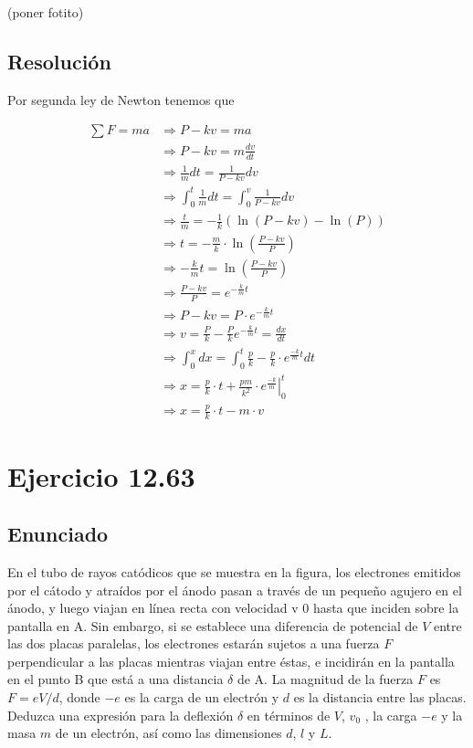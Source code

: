 \documentclass[11pt]{article}
\begin{document}
(poner fotito)

\subsection*{Resolución}

Por segunda ley de Newton tenemos que

\begin{align*}
  \sum F = ma &\Rightarrow P - kv = ma \\
  &\Rightarrow P - kv = m \frac{dv}{dt} \\ %
  &\Rightarrow \frac{1}{m}dt = \frac{1}{P - kv}dv \\
  &\Rightarrow \int_{0}^{t} \frac{1}{m}dt = \int_{0}^{v} \frac{1}{P - kv}dv \\ %
  &\Rightarrow \frac{t}{m} = -\frac{1}{k}(\ln{(P - kv)} - \ln{(P)}) \\
  &\Rightarrow t = -\frac{m}{k} \cdot \ln{\left(\frac{P - kv}{P}\right)} \\
  &\Rightarrow -\frac{k}{m}t = \ln{\left(\frac{P - kv}{P}\right)} \\
  &\Rightarrow \frac{P - kv}{P} = e^{-\frac{k}{m}t} \\
  &\Rightarrow P - kv = P \cdot e^{-\frac{k}{m}t} \\
  &\Rightarrow v = \frac{P}{k} - \frac{P}{k}e^{-\frac{k}{m}t} = \frac{dx}{dt} \\ %
  &\Rightarrow \int_{0}^{x} dx = \int_{0}^{t} \frac{p}{k} - \frac{p}{k} \cdot e^{\frac{-k}{m} t}dt \\
  &\Rightarrow x = \left. \frac{p}{k} \cdot t + \frac{pm}{k^2} \cdot e^{\frac{-k}{m}} \right\vert_0^t \\
  &\Rightarrow x = \frac{p}{k} \cdot t - m \cdot v %
\end{align*}


\section*{Ejercicio 12.63}

\subsection*{Enunciado}

En el tubo de rayos catódicos que se muestra en la figura, los electrones 
emitidos por el cátodo y atraídos por el ánodo pasan a través de
un pequeño agujero en el ánodo, y luego viajan en línea recta con velocidad
v 0 hasta que inciden sobre la pantalla en A. Sin embargo, si se establece una
diferencia de potencial de $V$ entre las dos placas paralelas, los electrones 
estarán sujetos a una fuerza $F$ perpendicular a las placas mientras viajan entre
éstas, e incidirán en la pantalla en el punto B que está a una distancia $\delta$ 
de A. La magnitud de la fuerza $F$ es $F = eV/d$, donde $-e$ es la carga de un 
electrón y $d$ es la distancia entre las placas. Deduzca una expresión para la 
deflexión $\delta$ en términos de $V$, $v_0$ , la carga $-e$ y la masa $m$ de un 
electrón, así como las dimensiones $d$, $l$ y $L$.
\end{document}
